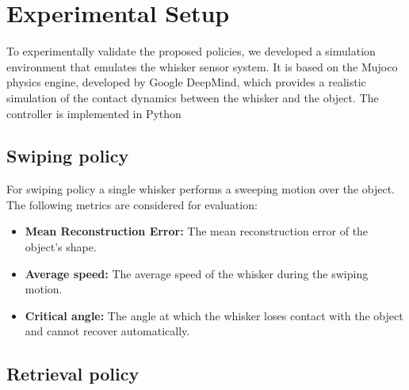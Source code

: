 

\chapter{Experimental Setup}

To experimentally validate the proposed policies, we developed a simulation environment that emulates the whisker sensor system.
It is based on the Mujoco physics engine, developed by Google DeepMind, which provides a realistic simulation of the contact dynamics between the whisker and the object.
The controller is implemented in Python

\section{Swiping policy}
For swiping policy a single whisker performs a sweeping motion over the object.
The following metrics are considered for evaluation:
\begin{itemize}
    \item \textbf{Mean Reconstruction Error:} The mean reconstruction error of the object's shape.
    \item \textbf{Average speed:} The average speed of the whisker during the swiping motion.
    \item \textbf{Critical angle:} The angle at which the whisker loses contact with the object and cannot recover automatically.
\end{itemize}

\section{Retrieval policy}

